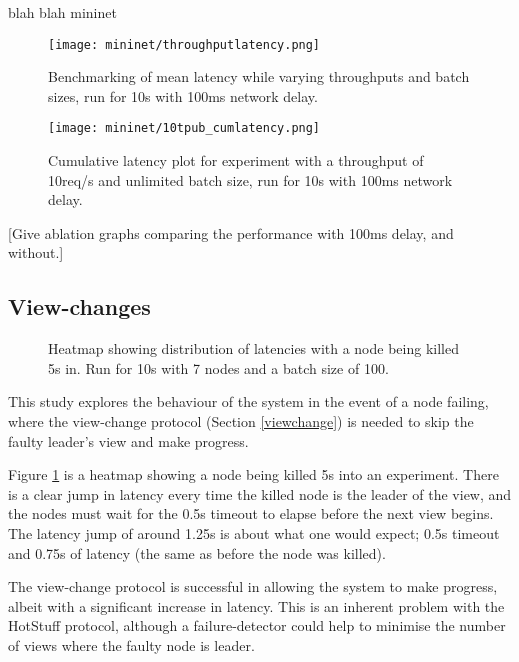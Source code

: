 blah blah mininet \cite{mininet,lantzNetworkLaptopRapid2010}
\begin{figure}[h!]
\centering
\texttt{[image: mininet/throughputlatency.png]}
\caption{Benchmarking of mean latency while varying throughputs and batch sizes, run for 10s with 100ms network delay.}
\end{figure}

\begin{figure}[h!]
\centering
\texttt{[image: mininet/10tpub\_cumlatency.png]}
\caption{Cumulative latency plot for experiment with a throughput of 10req/s and unlimited batch size, run for 10s with 100ms network delay.}
\end{figure}

[Give ablation graphs comparing the performance with 100ms delay, and without.]

\subsection{View-changes} \label{viewchangeeval}

\begin{figure}[h!]
\centering
\resizebox{\textwidth}{!}{}
\caption{Heatmap showing distribution of latencies with a node being killed 5s in. Run for 10s with 7 nodes and a batch size of 100.}
\label{viewchangeheatmap}
\end{figure}

This study explores the behaviour of the system in the event of a node failing, where the view-change protocol (Section \ref{viewchange}) is needed to skip the faulty leader's view and make progress.

Figure \ref{viewchangeheatmap} is a heatmap showing a node being killed 5s into an experiment. There is a clear jump in latency every time the killed node is the leader of the view, and the nodes must wait for the 0.5s timeout to elapse before the next view begins. The latency jump of around 1.25s is about what one would expect; 0.5s timeout and 0.75s of latency (the same as before the node was killed).

The view-change protocol is successful in allowing the system to make progress, albeit with a significant increase in latency. This is an inherent problem with the HotStuff protocol, although a failure-detector could help to minimise the number of views where the faulty node is leader.


